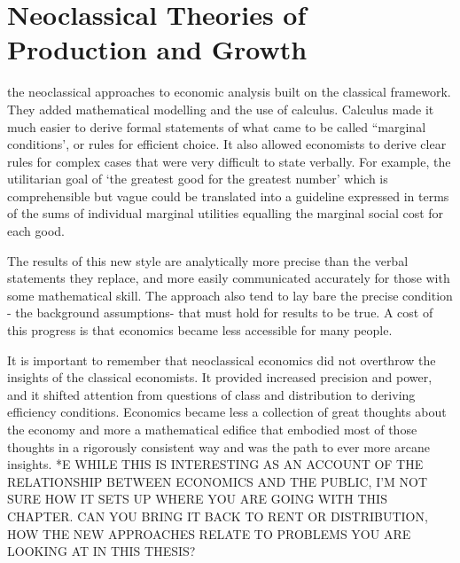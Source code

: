 \chapter{Neoclassical Theories of Production and Growth} 
\label{chapter-growth}

the \gls{neoclassical} approaches to economic analysis built on the classical framework. They added  mathematical modelling and the use of calculus. Calculus made it much easier to derive formal statements of what came to be called ``marginal conditions', or rules for efficient choice. It also allowed economists to derive clear rules for complex cases that were very difficult to state verbally. For example, the utilitarian goal of `the greatest good for the greatest number' which is comprehensible but vague could be translated into a guideline expressed in terms of the sums of individual marginal utilities equalling the marginal social cost for each good. 





The results of this new style are analytically more precise than the verbal statements they replace, and more easily communicated accurately for those with some mathematical skill. The approach also tend to lay bare the precise condition - the background assumptions- that must hold for results to be true. A cost of this progress is that economics became less accessible for many people. 



It is important to remember that neoclassical economics did not overthrow the insights of the classical economists. It provided increased precision and power, and it shifted attention from questions of class and distribution to deriving efficiency conditions. Economics became less a collection of great thoughts about the economy and more a mathematical edifice that embodied most of those thoughts in a rigorously consistent way and was the path to ever more arcane insights.
*E WHILE THIS IS INTERESTING AS AN ACCOUNT OF THE RELATIONSHIP BETWEEN ECONOMICS AND THE PUBLIC, I'M NOT SURE HOW IT SETS UP WHERE YOU ARE GOING WITH THIS CHAPTER. CAN YOU BRING IT BACK TO RENT OR DISTRIBUTION, HOW THE NEW APPROACHES RELATE TO PROBLEMS YOU ARE LOOKING AT IN THIS THESIS?

